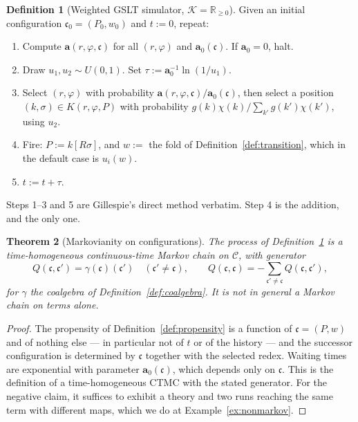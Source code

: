 \documentclass[11pt,a4paper]{article}
\theoremstyle{plain}
\newtheorem{theorem}{Theorem}
\theoremstyle{definition}
\newtheorem{definition}[theorem]{Definition}
\theoremstyle{remark}
\newcommand{\Rnn}{\mathbb{R}_{\geq 0}}
\newcommand{\Cfg}{\mathcal{C}}
\newcommand{\prop}{\mathbf{a}}
\newcommand{\wmap}{w}
\newcommand{\gfac}{g}
\begin{document}
\begin{definition}[Weighted GSLT simulator, $\mathcal{K} = \Rnn$]
\label{def:ssa}
Given an initial configuration $\mathfrak{c}_0 = (P_0, \wmap_0)$ and $t := 0$, repeat:
\begin{enumerate}[leftmargin=2.2em]
\item Compute $\prop(r,\varphi,\mathfrak{c})$ for all $(r,\varphi)$ and $\prop_0(\mathfrak{c})$. If
$\prop_0 = 0$, halt.
\item Draw $u_1, u_2 \sim U(0,1)$. Set $\tau := \prop_0^{-1}\ln(1/u_1)$.
\item Select $(r,\varphi)$ with probability $\prop(r,\varphi,\mathfrak{c})/\prop_0(\mathfrak{c})$,
then select a position $(k,\sigma) \in K(r,\varphi,P)$ with probability
$\gfac(k)\chi(k)/\sum_{k'}\gfac(k')\chi(k')$, using $u_2$.
\item Fire: $P := k[R\sigma]$, and $\wmap := $ the fold of Definition~\ref{def:transition}, which in
the default case is $u_i(\wmap)$.
\item $t := t + \tau$.
\end{enumerate}
\end{definition}

Steps 1--3 and 5 are Gillespie's direct method \cite{gillespie77} verbatim. Step 4 is the addition,
and the only one.

\begin{theorem}[Markovianity on configurations]
\label{thm:markov}
The process of Definition~\ref{def:ssa} is a time-homogeneous continuous-time Markov chain on
$\Cfg$, with generator
\[
Q(\mathfrak{c}, \mathfrak{c}')
= \gamma(\mathfrak{c})(\mathfrak{c}')
\quad (\mathfrak{c}' \neq \mathfrak{c}),
\qquad
Q(\mathfrak{c},\mathfrak{c}) = -\!\!\sum_{\mathfrak{c}' \neq \mathfrak{c}}\!\! Q(\mathfrak{c},\mathfrak{c}'),
\]
for $\gamma$ the coalgebra of Definition~\ref{def:coalgebra}. It is \emph{not} in general a Markov
chain on terms alone.
\end{theorem}

\begin{proof}
The propensity of Definition~\ref{def:propensity} is a function of $\mathfrak{c} = (P,\wmap)$ and of
nothing else --- in particular not of $t$ or of the history --- and the successor configuration is
determined by $\mathfrak{c}$ together with the selected redex. Waiting times are exponential with
parameter $\prop_0(\mathfrak{c})$, which depends only on $\mathfrak{c}$. This is the definition of a
time-homogeneous CTMC with the stated generator. For the negative claim, it suffices to exhibit a
theory and two runs reaching the same term with different maps, which we do at
Example~\ref{ex:nonmarkov}.
\end{proof}
\end{document}
